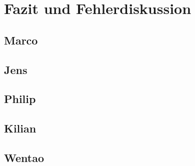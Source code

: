 \chapter{Fazit und Fehlerdiskussion}
\label{chapter:fazit}
\section{Marco}
\section{Jens}
\section{Philip}
\section{Kilian}
\section{Wentao}
\newpage